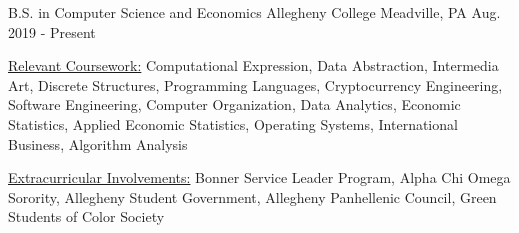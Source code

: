 

\begin{cventries}

  \cventry
    {B.S. in Computer Science and Economics} %
    {Allegheny College} %
    {Meadville, PA} %
    {Aug. 2019 - Present} %
    {
      \begin{cvitems} %
        \item {\underline{Relevant Coursework:} Computational Expression, Data Abstraction, Intermedia Art, Discrete Structures, Programming Languages, Cryptocurrency Engineering, Software Engineering, Computer Organization, Data Analytics, Economic Statistics, Applied Economic Statistics, Operating Systems, International Business, Algorithm Analysis}
        \item {\underline {Extracurricular Involvements:} Bonner Service Leader Program, Alpha Chi Omega Sorority, Allegheny Student Government, Allegheny Panhellenic Council, Green Students of Color Society}
      \end{cvitems}
    }

\end{cventries}
